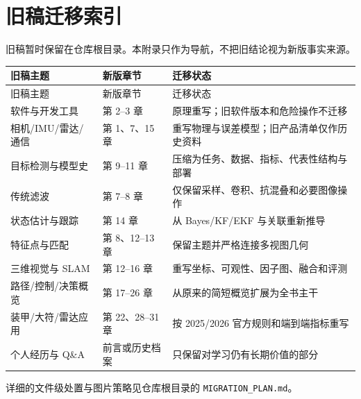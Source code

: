 \chapter{旧稿迁移索引}
\label{app:legacy-map}

旧稿暂时保留在仓库根目录。本附录只作为导航，不把旧结论视为新版事实来源。

\begin{longtable}{p{}p{}p{}}
\toprule
旧稿主题 & 新版章节 & 迁移状态 \\
\midrule
\endfirsthead
\toprule
旧稿主题 & 新版章节 & 迁移状态 \\
\midrule
\endhead
软件与开发工具 & 第 2--3 章 & 原理重写；旧软件版本和危险操作不迁移 \\
相机/IMU/雷达/通信 & 第 1、7、15 章 & 重写物理与误差模型；旧产品清单仅作历史资料 \\
目标检测与模型史 & 第 9--11 章 & 压缩为任务、数据、指标、代表性结构与部署 \\
传统滤波 & 第 7--8 章 & 仅保留采样、卷积、抗混叠和必要图像操作 \\
状态估计与跟踪 & 第 14 章 & 从 Bayes/KF/EKF 与关联重新推导 \\
特征点与匹配 & 第 8、12--13 章 & 保留主题并严格连接多视图几何 \\
三维视觉与 SLAM & 第 12--16 章 & 重写坐标、可观性、因子图、融合和评测 \\
路径/控制/决策概览 & 第 17--26 章 & 从原来的简短概览扩展为全书主干 \\
装甲/大符/雷达应用 & 第 22、28--31 章 & 按 2025/2026 官方规则和端到端指标重写 \\
个人经历与 Q\&A & 前言或历史档案 & 只保留对学习仍有长期价值的部分 \\
\bottomrule
\end{longtable}

详细的文件级处置与图片策略见仓库根目录的 \texttt{MIGRATION\_PLAN.md}。

